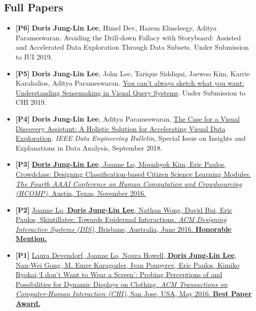 \documentclass{res}
\begin{document}
\begin{resume}
\section{Full Papers}
\begin{itemize}[leftmargin=0in,label={}]
\item \textbf{[P6]} \textbf{Doris Jung-Lin Lee}, Himel Dev, Hazem Elmeleegy, Aditya Parameswaran. Avoiding the Drill-down Fallacy with Storyboard: Assisted and Accelerated Data Exploration Through Data Subsets. Under Submission to IUI 2019.  
\item \textbf{[P5]} \textbf{Doris Jung-Lin Lee}, John Lee, Tarique Siddiqui, Jaewoo Kim, Karrie Karahalios, Aditya Parameswaran. \href{https://arxiv.org/abs/1710.00763}{You can't always sketch what you want: Understanding Sensemaking in Visual Query Systems}. Under Submission to CHI 2019.
\item \textbf{[P4]} \textbf{Doris Jung-Lin Lee}, Aditya Parameswaran, \href{http://sites.computer.org/debull/A18sept/p3.pdf}{The Case for a Visual Discovery Assistant: A Holistic Solution for Accelerating Visual Data Exploration}. \textit{IEEE Data Engineering Bulletin}, Special Issue on Insights and Explanations in Data Analysis, September 2018.
\item \textbf{[P3]} \href{http://aaai.org/ocs/index.php/HCOMP/HCOMP16/paper/viewFile/14027/13638}{\textbf{Doris Jung-Lin Lee}, Joanne Lo, Moonhyok Kim, Eric Paulos, Crowdclass: Designing Classification-based Citizen Science Learning Modules. \textit{The Fourth AAAI Conference on Human Computation and Crowdsourcing (HCOMP)}, Austin, Texas, November 2016.}
\item \textbf{[P2]} \href{http://dl.acm.org/citation.cfm?id=2901885&CFID=765226474&CFTOKEN=46922780}{Joanne Lo, \textbf{Doris Jung-Lin Lee}, Nathan Wong, David Bui, Eric Paulos, Skintillates: Towards Epidermal Interactions.  \textit{ACM Designing Interactive Systems (DIS)}, Brisbane, Australia, June 2016. \textbf{Honorable Mention.}}
\item \textbf{[P1]} \href{http://dl.acm.org/citation.cfm?id=2858192&CFID=765226474&CFTOKEN=46922780}{Laura Devendorf, Joanne Lo, Noura Howell, \textbf{Doris Jung-Lin Lee}, Nan-Wei Gong, M. Emre Karagozler, Ivan  Poupyrev, Eric Paulos, Kimiko Ryokai,\hspace{1pt}`I don't Want to Wear a Screen': Probing Perceptions of and Possibilities for Dynamic Displays on Clothing. \textit{ACM Transactions on Computer-Human Interaction (CHI)}, San Jose, USA, May 2016. \textbf{Best Paper Award.}}
\end{itemize}
\vspace{-10pt}

\end{resume}
\end{document}
